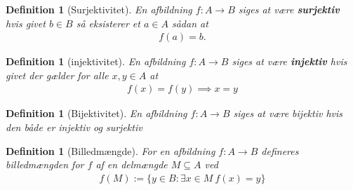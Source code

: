 \documentclass[10pt,twoside,openany,final]{memoir}
\theoremstyle{break}
\newtheorem{definition}[section]{Definition}
\theoremstyle{Break}
\begin{document}
\begin{definition}[Surjektivitet]
En afbildning $f \colon A \to B$ siges at være \textbf{surjektiv} hvis givet $b \in B$ så eksisterer et $a \in A$ sådan at
\begin{align*}
f(a)=b.
\end{align*}
\end{definition}

\begin{definition}[injektivitet]
En afbildning $f \colon A \to B$ siges at være \textbf{injektiv} hvis givet der gælder for alle $x,y \in A$ at 
\begin{align*}
f(x)=f(y) \implies x=y
\end{align*}
\end{definition}

\begin{definition}[Bijektivitet]
En afbildning $f \colon A \to B$ siges at være bijektiv hvis den både er injektiv og surjektiv
\end{definition}

\begin{definition}[Billedmængde]
For en afbildning $f \colon A \to B$ defineres billedmængden for $f$ af en delmængde $M \subseteq A$ ved
\begin{align*}
f(M):=\{ y \in B \colon \exists x \in M \ f(x)=y \}
\end{align*}
\end{definition}
\end{document}
